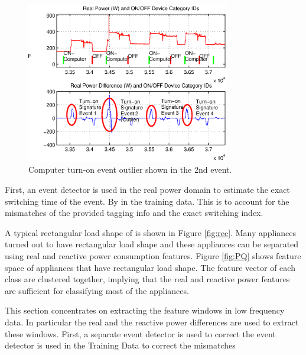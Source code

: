 \documentclass[conference]{IEEEtran}
\begin{document}
\begin{figure}[!t]
	\centering
	\includegraphics[width=3.5in]{fig/outlier.eps}
	\caption{Computer turn-on event outlier shown in the 2nd event.}
	\label{fig:outlier}
\end{figure}


	
	

First, an event detector is used in the real power domain to estimate the exact switching time of the event.  By  in the training data.  This is to account for the mismatches of the provided tagging info and the exact switching index.  

A typical rectangular load shape of is shown in Figure \ref{fig:rec}.  Many appliances turned out to have rectangular load shape and these appliances can be separated using real and reactive power consumption features.  Figure \ref{fig:PQ} shows feature space of appliances that have rectangular load shape.  The feature vector of each class are clustered together, implying that the real and reactive power features are sufficient for classifying most of the appliances.


This section concentrates on extracting the feature windows in low frequency data.  In particular the real and the reactive power differences are used to extract these windows.  First, a separate event detector is used to correct the   event detector is used in the Training Data to correct the mismatches 
\end{document}

